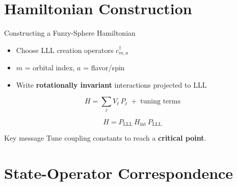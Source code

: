 \documentclass[aspectratio=169]{beamer}
\begin{document}
\section{Hamiltonian Construction}

\begin{frame}{Constructing a Fuzzy-Sphere Hamiltonian}
  \begin{itemize}
    \item Choose LLL creation operators $c^\dagger_{m,a}$
    \item $m$ = orbital index, $a$ = flavor/spin
    \item Write \textbf{rotationally invariant} interactions projected to LLL
  \end{itemize}

  \begin{equation}
    H = \sum_{\ell} V_\ell \, P_\ell \;+\; \text{tuning terms}
  \end{equation}

  \begin{equation}
    H = P_{\mathrm{LLL}} \, H_{\mathrm{int}} \, P_{\mathrm{LLL}}
  \end{equation}

  \begin{center}
  \end{center}

  \begin{block}{Key message}
    Tune coupling constants to reach a \textbf{critical point}.
  \end{block}
\end{frame}

\section{State-Operator Correspondence}
\end{document}
